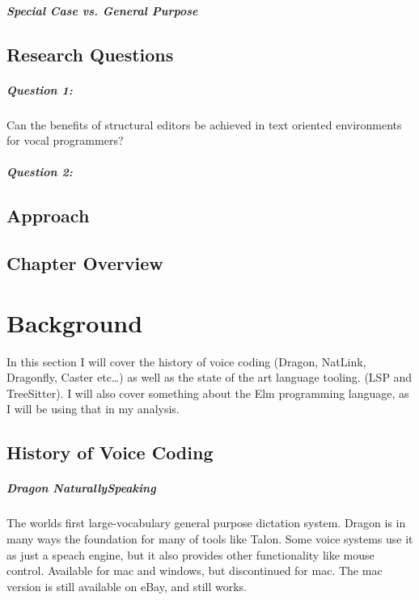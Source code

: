 \documentclass[a4paper,english]{ifimaster}
\begin{document}
\paragraph{Special Case vs. General Purpose}\label{scgp}

\section{Research Questions}
\paragraph{Question 1:}
Can the benefits of structural editors be achieved in text oriented environments for vocal programmers?
\paragraph{Question 2:}


\section{Approach}

\section{Chapter Overview}


\chapter{Background}\label{background}
In this section I will cover the history of voice coding (Dragon, NatLink, Dragonfly, Caster etc\ldots)
as well as the state of the art language tooling. (LSP and TreeSitter).
I will also cover something about the Elm programming language, as I will be using that in my analysis.


\section{History of Voice Coding}

\paragraph{Dragon NaturallySpeaking}
The worlds first large-vocabulary general purpose dictation system.
Dragon is in many ways the foundation for many of tools like Talon.
Some voice systems use it as just a speach engine, but it also provides other functionality like mouse control.
Available for mac and windows, but discontinued for mac.%
The mac version is still available on eBay, and still works. %
\end{document}
